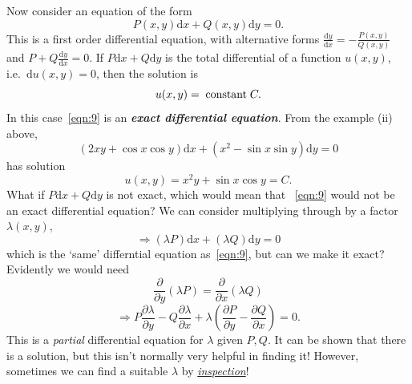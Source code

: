 \documentclass[12pt]{report}
\theoremstyle{definition}
\begin{document}
\bigskip
Now consider an equation of the form
\begin{equation}\label{eqn:9}
    P(x,y)\mathrm{d}x + Q(x,y)\mathrm{d}y = 0.
\end{equation}
This is a first order differential equation, with alternative forms
$\frac{\mathrm{d}y}{\mathrm{d}x} = -\frac{P(x,y)}{Q(x,y)}$ and $P + Q\frac{\mathrm{d}y}{\mathrm{d}x} = 0$.
If $P\mathrm{d}x + Q\mathrm{d}y$ is the total differential of a function $u(x,y)$,
i.e.\ $\mathrm{d}u(x,y) = 0$,
then the solution is \[
    u(x,y) = \;\textnormal{constant}\;C.
\]In this case~\eqref{eqn:9} is an \textbf{\emph{exact differential equation}}.  
From the example (ii) above,\[
    (2xy + \cos{x}\cos{y})\mathrm{d}x + (x^{2} - \sin{x}\sin{y})\mathrm{d}y = 0
\]has solution\[
u(x,y) = x^{2}y + \sin{x}\cos{y} = C.
\]
What if $P\mathrm{d}x + Q\mathrm{d}y$ is not exact, which would mean that%
~\eqref{eqn:9} would not be an exact differential equation?
We can consider multiplying through by a factor $\lambda(x,y)$,\[
    \Rightarrow{}(\lambda P)\mathrm{d}x + (\lambda Q)\mathrm{d}y = 0
\]which is the `same' differntial equation as~\eqref{eqn:9},
but can we make it exact? Evidently we would need
\begin{equation}\label{eqn:10}
    \frac{\partial}{\partial y} (\lambda P) = \frac{\partial}{\partial x} (\lambda Q)
\end{equation}
\[
    \Rightarrow{}P\frac{\partial \lambda}{\partial y} - Q\frac{\partial \lambda}{\partial x} 
    + \lambda\left(\frac{\partial P}{\partial y} - \frac{\partial Q}{\partial x} \right) = 0.
\]
This is a \emph{partial} differential equation for $\lambda$ given $P, Q$.
It can be shown that there is a solution, but
this isn't normally very helpful in finding it!
However, sometimes we can find a suitable $\lambda$ by \emph{\underline{inspection}}!
\end{document}
